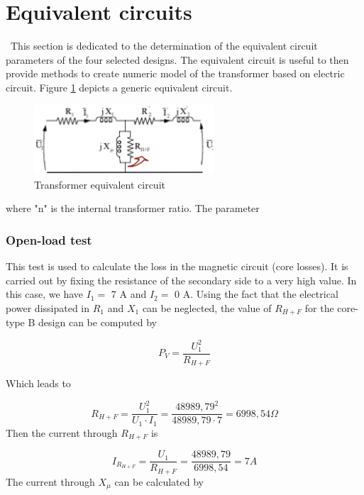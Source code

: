 \documentclass[12pt,a4paper]{report}
\begin{document}
\section{Equivalent circuits}
\quad\, This section is dedicated to the determination of the equivalent circuit parameters of the four selected designs. The equivalent circuit is useful to then provide methods to create numeric model of the transformer based on electric circuit. Figure \ref{fig:equivalent_circuit} depicts a generic equivalent circuit.

 \begin{figure}[h]
    \centering
    \includegraphics[width=0.6\textwidth]{equivalent_circuit.PNG}
    \caption{Transformer equivalent circuit}
    \label{fig:equivalent_circuit}
\end{figure}
where "n" is the internal transformer ratio.
The parameter 
\subsubsection{Open-load test}
This test is used to calculate the loss in the magnetic circuit (core losses). It is carried out by fixing the resistance of the secondary side to a very high value. In this case, we have $I_1 =$ 7 A and $I_2 =$ 0 A. Using the fact that the electrical power dissipated in $R_1$ and $X_1$ can be neglected, the value of $R_{H+F}$ for the core-type B design can be computed by

\begin{equation}
   P_V = \frac{U_1^2}{R_{H+F}}
\end{equation}

Which leads to

\begin{equation}
    R_{H+F} = \frac{U_1^2}{U_1 \cdot I_1} = \frac{48989,79^2}{48989,79 \cdot 7} = 6998,54 \Omega
\end{equation}
Then the current through $R_{H+F}$ is

\begin{equation}
    I_{R_{H+F}} = \frac{U_1}{R_{H+F}} = \frac{48989,79}{6998,54} = 7 A
\end{equation}
The current through $X_\mu$ can be calculated by 
\end{document}
